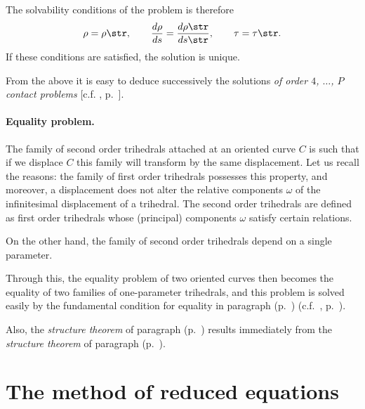 The solvability conditions of the problem is therefore
\[
\rho=\rho\str,\qquad\frac{d\rho}{ds}=\frac{d\rho\str}{ds\str},\qquad\tau=\tau\str.
\]
If these conditions are satisfied, the solution is unique.

From the above it is easy to deduce successively the solutions \emph{of order $4$, $\dots$, $P$ contact problems} [c.f. , p.~\pageref{sec:12}].

\paragraph{Equality problem.}
\label{sec:21}
The family of second order trihedrals attached at an oriented curve $C$ is such that if we displace $C$ this family will transform by the same displacement. Let us recall the reasons: the family of first order trihedrals possesses this property, and moreover, a displacement does not alter the relative components $\omega$ of the infinitesimal displacement of a trihedral. The second order trihedrals are defined as first order trihedrals whose (principal) components $\omega$ satisfy certain relations.

On the other hand, the family of second order trihedrals depend on a single parameter.

Through this, the equality problem of two oriented curves then becomes the equality of two families of one-parameter trihedrals, and this problem is solved easily by the fundamental condition for equality in paragraph  (p.~\pageref{sec:7}) (c.f.~, p.~\pageref{sec:13}).

Also, the \emph{structure theorem} of paragraph  (p.~\pageref{sec:14}) results immediately from the \emph{structure theorem} of paragraph  (p.~\pageref{sec:7}).



\section{The method of reduced equations}
\label{sec:meth-reduc-equat}

\addtocounter{paragraph}{-1}

